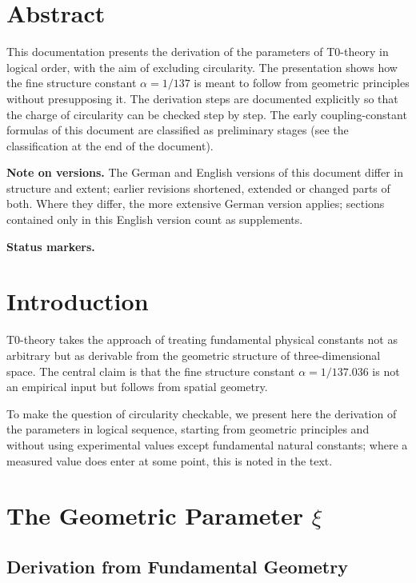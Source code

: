 \hfuzz=10pt
\section*{Abstract}
		This documentation presents the derivation of the parameters of T0-theory in logical order, with the aim of excluding circularity. The presentation shows how the fine structure constant $\alpha = 1/137$ is meant to follow from geometric principles without presupposing it. The derivation steps are documented explicitly so that the charge of circularity can be checked step by step. The early coupling-constant formulas of this document are classified as preliminary stages (see the classification at the end of the document).

	\medskip\noindent\textbf{Note on versions.} The German and English versions of this document differ in structure and extent; earlier revisions shortened, extended or changed parts of both. Where they differ, the more extensive German version applies; sections contained only in this English version count as supplements.


\medskip\noindent\textbf{Status markers.}



	\section{Introduction}
	
	T0-theory takes the approach of treating fundamental physical constants not as arbitrary but as derivable from the geometric structure of three-dimensional space. The central claim is that the fine structure constant $\alpha = 1/137.036$ is not an empirical input but follows from spatial geometry.
	
	To make the question of circularity checkable, we present here the derivation of the parameters in logical sequence, starting from geometric principles and without using experimental values except fundamental natural constants; where a measured value does enter at some point, this is noted in the text.
	
\section{The Geometric Parameter $\xi$}

\subsection{Derivation from Fundamental Geometry}

